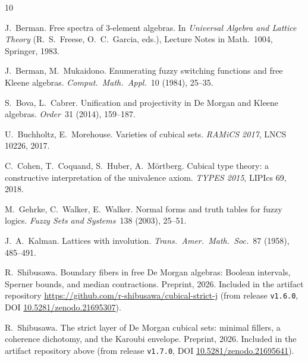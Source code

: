 \documentclass[11pt]{amsart}
\theoremstyle{definition}
\begin{document}
\begin{thebibliography}{10}

J.~Berman.
\newblock Free spectra of $3$-element algebras.
\newblock In \emph{Universal Algebra and Lattice Theory}
  (R.~S.~Freese, O.~C.~Garcia, eds.), Lecture Notes in
  Math.\ 1004, Springer, 1983.

J.~Berman, M.~Mukaidono.
\newblock Enumerating fuzzy switching functions and free Kleene
  algebras.
\newblock \emph{Comput.\ Math.\ Appl.}\ 10 (1984), 25--35.

S.~Bova, L.~Cabrer.
\newblock Unification and projectivity in De Morgan and Kleene
  algebras.
\newblock \emph{Order}\ 31 (2014), 159--187.

U.~Buchholtz, E.~Morehouse.
\newblock Varieties of cubical sets.
\newblock \emph{RAMiCS 2017}, LNCS 10226, 2017.

C.~Cohen, T.~Coquand, S.~Huber, A.~M\"ortberg.
\newblock Cubical type theory: a constructive interpretation of the
  univalence axiom.
\newblock \emph{TYPES 2015}, LIPIcs 69, 2018.

M.~Gehrke, C.~Walker, E.~Walker.
\newblock Normal forms and truth tables for fuzzy logics.
\newblock \emph{Fuzzy Sets and Systems}\ 138 (2003), 25--51.

J.~A.~Kalman.
\newblock Lattices with involution.
\newblock \emph{Trans.\ Amer.\ Math.\ Soc.}\ 87 (1958), 485--491.

R.~Shibusawa.
\newblock Boundary fibers in free De Morgan algebras: Boolean
  intervals, Sperner bounds, and median contractions.
\newblock Preprint, 2026.  Included in the artifact repository
  \url{https://github.com/r-shibusawa/cubical-strict-j} (from
  release \texttt{v1.6.0}, DOI
  \href{https://doi.org/10.5281/zenodo.21695307}%
  {10.5281/zenodo.21695307}).

R.~Shibusawa.
\newblock The strict layer of De Morgan cubical sets: minimal
  fillers, a coherence dichotomy, and the Karoubi envelope.
\newblock Preprint, 2026.  Included in the artifact repository
  above (from release \texttt{v1.7.0}, DOI
  \href{https://doi.org/10.5281/zenodo.21695641}%
  {10.5281/zenodo.21695641}).

\end{thebibliography}
\end{document}
